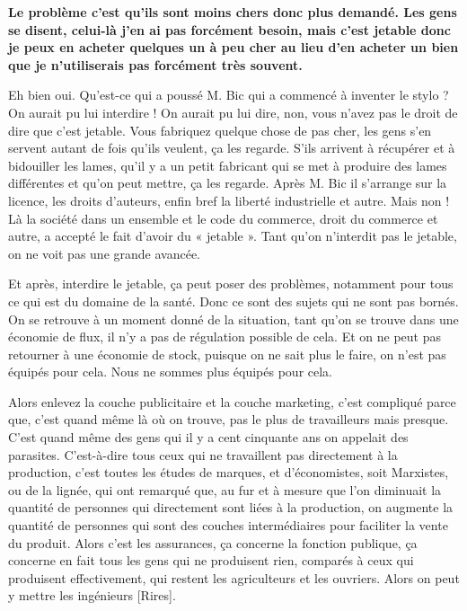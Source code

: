 \begin{small}
\vspace{1\baselineskip}

\textbf{Le problème c'est qu'ils sont moins chers donc plus demandé. Les gens se disent, celui-là j'en ai pas forcément besoin, mais c'est jetable donc je peux en acheter quelques un à peu cher au lieu d'en acheter un bien que je n'utiliserais pas forcément très souvent.}

\vspace{1\baselineskip}

Eh bien oui. Qu'est-ce qui a poussé M. Bic qui a commencé à inventer le stylo ? On aurait pu lui interdire ! On aurait pu lui dire, non, vous n'avez pas le droit de dire que c'est jetable. Vous fabriquez quelque chose de pas cher, les gens s'en servent autant de fois qu'ils veulent, ça les regarde. S’ils arrivent à récupérer et à bidouiller les lames, qu'il y a un petit fabricant qui se met à produire des lames différentes et qu'on peut mettre, ça les regarde. Après M. Bic il s'arrange sur la licence, les droits d'auteurs, enfin bref la liberté industrielle et autre. Mais non ! Là la société dans un ensemble et le code du commerce, droit du commerce et autre, a accepté le fait d'avoir du « jetable ». Tant qu’on n’interdit pas le jetable, on ne voit pas une grande avancée. 

Et après, interdire le jetable, ça peut poser des problèmes, notamment pour tous ce qui est du domaine de la santé. Donc ce sont des sujets qui ne sont pas bornés. On se retrouve à un moment donné de la situation, tant qu'on se trouve dans une économie de flux, il n'y a pas de régulation possible de cela. Et on ne peut pas retourner à une économie de stock, puisque on ne sait plus le faire, on n'est pas équipés pour cela. Nous ne sommes plus équipés pour cela. 

\smallbreak
Alors enlevez la couche publicitaire et la couche marketing, c'est compliqué parce que, c'est quand même là où on trouve, pas le plus de travailleurs mais presque. C'est quand même des gens qui il y a cent cinquante ans on appelait des parasites. C'est-à-dire tous ceux qui ne travaillent pas directement à la production, c'est toutes les études de marques, et d'économistes, soit Marxistes, ou de la lignée, qui ont remarqué que, au fur et à mesure que l'on diminuait la quantité de personnes qui directement sont liées à la production, on augmente la quantité de personnes qui sont des couches intermédiaires pour faciliter la vente du produit. Alors c'est les assurances, ça concerne la fonction publique, ça concerne en fait tous les gens qui ne produisent rien, comparés à ceux qui produisent effectivement, qui restent les agriculteurs et les ouvriers. Alors on peut y mettre les ingénieurs [Rires].


\end{small}
